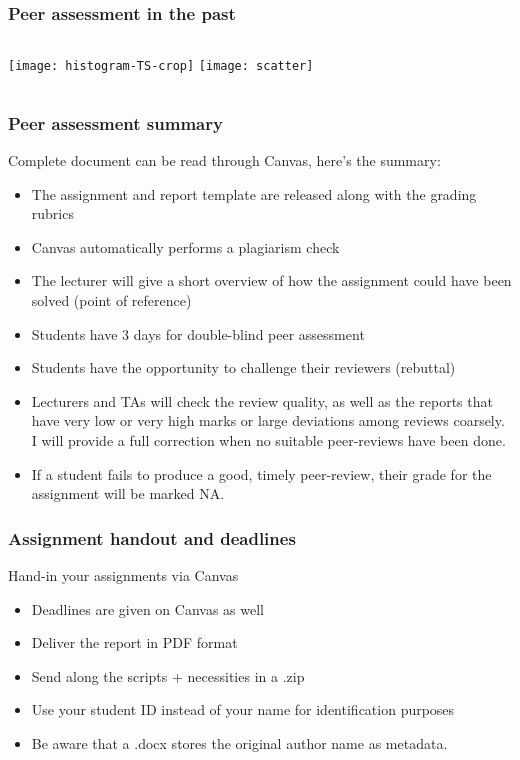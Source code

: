 \begin{frame}
  \frametitle{Peer assessment in the past}
  \begin{columns}
    \centering
      \texttt{[image: histogram-TS-crop]}
    \centering
      \texttt{[image: scatter]}   
  \end{columns}
 \end{frame}

 \begin{frame}
  \frametitle{Peer assessment summary}
  Complete document can be read through Canvas, here's the summary:
  \begin{itemize}
    \item The assignment and report template are released along with the grading rubrics
    \item Canvas automatically performs a plagiarism check
    \item The lecturer will give a short overview of how the assignment could have been solved (point of reference)
    \item Students have 3 days for double-blind peer assessment
    \item Students have the opportunity to challenge their reviewers (rebuttal)
    \item Lecturers and TAs will check the review quality, as well as the reports that have very low or very high marks or large deviations among reviews coarsely. I will provide a full correction when no suitable peer-reviews have been done.
    \item If a student fails to produce a good, timely peer-review, their grade for the assignment will be marked NA.
  \end{itemize}
 \end{frame}
%
\begin{frame}
 \frametitle{Assignment handout and deadlines}
     Hand-in your assignments via Canvas
    \begin{itemize}
      \item Deadlines are given on Canvas as well
      \item Deliver the report in PDF format
      \item Send along the scripts + necessities in a .zip
      \item Use your student ID instead of your name for identification purposes
      \item Be aware that a .docx stores the original author name as metadata.
    \end{itemize}
\end{frame}


